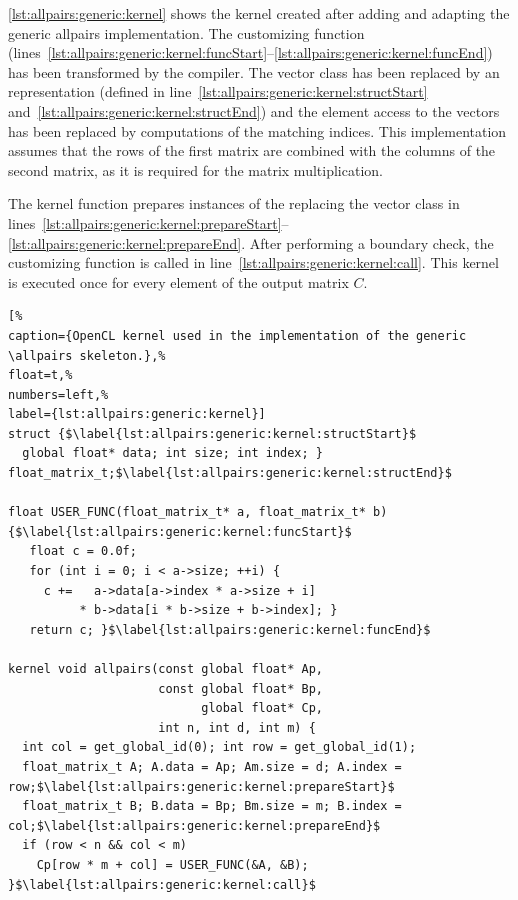 \autoref{lst:allpairs:generic:kernel} shows the \OpenCL kernel created after adding and adapting the generic allpairs implementation.
The customizing function (lines~\ref{lst:allpairs:generic:kernel:funcStart}--\ref{lst:allpairs:generic:kernel:funcEnd}) has been transformed by the  compiler.
The vector class has been replaced by an \OpenCL representation (defined in line~\ref{lst:allpairs:generic:kernel:structStart} and~\ref{lst:allpairs:generic:kernel:structEnd}) and the element access to the vectors has been replaced by computations of the matching indices.
This implementation assumes that the rows of the first matrix are combined with the columns of the second matrix, as it is required for the matrix multiplication.

The  kernel function prepares instances of the  replacing the vector class in lines~\ref{lst:allpairs:generic:kernel:prepareStart}--\ref{lst:allpairs:generic:kernel:prepareEnd}.
After performing a boundary check, the customizing function is called in line~\ref{lst:allpairs:generic:kernel:call}.
This \OpenCL kernel is executed once for every element of the output matrix $C$.

\begin{lstlisting}[%                                                             
caption={OpenCL kernel used in the implementation of the generic \allpairs skeleton.},%
float=t,%                                                                       
numbers=left,%
label={lst:allpairs:generic:kernel}]
struct {$\label{lst:allpairs:generic:kernel:structStart}$
  global float* data; int size; int index; } float_matrix_t;$\label{lst:allpairs:generic:kernel:structEnd}$

float USER_FUNC(float_matrix_t* a, float_matrix_t* b) {$\label{lst:allpairs:generic:kernel:funcStart}$
   float c = 0.0f;
   for (int i = 0; i < a->size; ++i) {
     c +=   a->data[a->index * a->size + i]
          * b->data[i * b->size + b->index]; }
   return c; }$\label{lst:allpairs:generic:kernel:funcEnd}$

kernel void allpairs(const global float* Ap,
                     const global float* Bp,
                           global float* Cp,
                     int n, int d, int m) {
  int col = get_global_id(0); int row = get_global_id(1);
  float_matrix_t A; A.data = Ap; Am.size = d; A.index = row;$\label{lst:allpairs:generic:kernel:prepareStart}$
  float_matrix_t B; B.data = Bp; Bm.size = m; B.index = col;$\label{lst:allpairs:generic:kernel:prepareEnd}$
  if (row < n && col < m)
    Cp[row * m + col] = USER_FUNC(&A, &B); }$\label{lst:allpairs:generic:kernel:call}$
\end{lstlisting}

